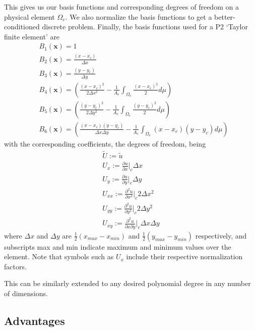 \documentclass[11pt]{article}
\let\bld\boldsymbol
\begin{document}
This gives us our basis functions and corresponding degrees of freedom on a physical element $\Omega_e$. We also normalize the basis functions to get a better-conditioned discrete problem. Finally, the basis functions used for a P2 `Taylor finite element' are
\begin{align}
&B_1(\bld{x}) = 1 \\
&B_2(\bld{x}) = \frac{(x-x_c)}{\Delta x} \\
&B_3(\bld{x}) = \frac{(y-y_c)}{\Delta y} \\
&B_4(\bld{x}) = \left( \frac{(x-x_c)^2}{2\Delta x^2} - \frac{1}{A_e}\int_{\Omega_e} \frac{(x-x_c)^2}{2}d\mu \right) \\
&B_5(\bld{x}) = \left( \frac{(y-y_c)^2}{2\Delta y^2} -\frac{1}{A_e}\int_{\Omega_e} \frac{(y-y_c)^2}{2}d\mu \right) \\
&B_6(\bld{x}) = \left( \frac{(x-x_c)(y-y_c)}{\Delta x\Delta y} - \frac{1}{A_e}\int_{\Omega_e} (x-x_c)(y-y_c)d\mu \right)
\end{align}
with the corresponding coefficients, the degrees of freedom, being
\begin{align}
\tilde{U} := \tilde{u} \\
U_x := \frac{\partial u}{\partial x}\Big|_c \Delta x \\
U_y := \frac{\partial u}{\partial y}\Big|_c \Delta y \\
U_{xx} := \frac{\partial^2 u}{\partial x^2}\Big|_c 2\Delta x^2 \\
U_{yy} := \frac{\partial^2 u}{\partial y^2}\Big|_c 2\Delta y^2 \\
U_{xy} := \frac{\partial^2 u}{\partial x\partial y}\Big|_c \Delta x\Delta y
\end{align}
where $\Delta x$ and $\Delta y$ are $\frac12 (x_{max}-x_{min})$ and $\frac12 (y_{max}-y_{min})$ respectively, and subscripts max and min indicate maximum and minimum values over the element. Note that symbols such as $U_x$ include their respective normalization factors.

This can be similarly extended to any desired polynomial degree in any number of dimensions.

\subsection{Advantages}
\end{document}
